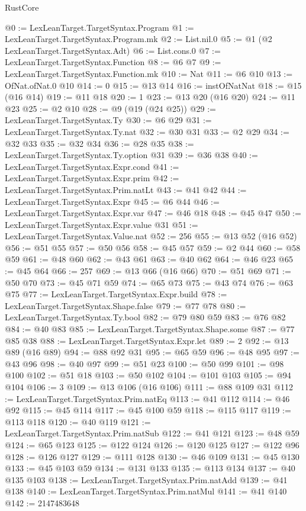 \begin{lexlean}{RustCore}
\begin{coremodule}
@0 := LexLeanTarget.TargetSyntax.Program
@1 := LexLeanTarget.TargetSyntax.Program.mk
@2 := List.nil.{0}
@5 := @1 (@2 LexLeanTarget.TargetSyntax.Adt)
@6 := List.cons.{0}
@7 := LexLeanTarget.TargetSyntax.Function
@8 := @6 @7
@9 := LexLeanTarget.TargetSyntax.Function.mk
@10 := Nat
@11 := @6 @10
@13 := OfNat.ofNat.{0} @10
@14 := 0
@15 := @13 @14
@16 := instOfNatNat
@18 := @15 (@16 @14)
@19 := @11 @18
@20 := 1
@23 := @13 @20 (@16 @20)
@24 := @11 @23
@25 := @2 @10
@28 := @9 (@19 (@24 @25))
@29 := LexLeanTarget.TargetSyntax.Ty
@30 := @6 @29
@31 := LexLeanTarget.TargetSyntax.Ty.nat
@32 := @30 @31
@33 := @2 @29
@34 := @32 @33
@35 := @32 @34
@36 := @28 @35
@38 := LexLeanTarget.TargetSyntax.Ty.option @31
@39 := @36 @38
@40 := LexLeanTarget.TargetSyntax.Expr.cond
@41 := LexLeanTarget.TargetSyntax.Expr.prim
@42 := LexLeanTarget.TargetSyntax.Prim.natLt
@43 := @41 @42
@44 := LexLeanTarget.TargetSyntax.Expr
@45 := @6 @44
@46 := LexLeanTarget.TargetSyntax.Expr.var
@47 := @46 @18
@48 := @45 @47
@50 := LexLeanTarget.TargetSyntax.Expr.value @31
@51 := LexLeanTarget.TargetSyntax.Value.nat
@52 := 256
@55 := @13 @52 (@16 @52)
@56 := @51 @55
@57 := @50 @56
@58 := @45 @57
@59 := @2 @44
@60 := @58 @59
@61 := @48 @60
@62 := @43 @61
@63 := @40 @62
@64 := @46 @23
@65 := @45 @64
@66 := 257
@69 := @13 @66 (@16 @66)
@70 := @51 @69
@71 := @50 @70
@73 := @45 @71 @59
@74 := @65 @73
@75 := @43 @74
@76 := @63 @75
@77 := LexLeanTarget.TargetSyntax.Expr.build
@78 := LexLeanTarget.TargetSyntax.Shape.false
@79 := @77 @78
@80 := LexLeanTarget.TargetSyntax.Ty.bool
@82 := @79 @80 @59
@83 := @76 @82
@84 := @40 @83
@85 := LexLeanTarget.TargetSyntax.Shape.some
@87 := @77 @85 @38
@88 := LexLeanTarget.TargetSyntax.Expr.let
@89 := 2
@92 := @13 @89 (@16 @89)
@94 := @88 @92 @31
@95 := @65 @59
@96 := @48 @95
@97 := @43 @96
@98 := @40 @97
@99 := @51 @23
@100 := @50 @99
@101 := @98 @100
@102 := @51 @18
@103 := @50 @102
@104 := @101 @103
@105 := @94 @104
@106 := 3
@109 := @13 @106 (@16 @106)
@111 := @88 @109 @31
@112 := LexLeanTarget.TargetSyntax.Prim.natEq
@113 := @41 @112
@114 := @46 @92
@115 := @45 @114
@117 := @45 @100 @59
@118 := @115 @117
@119 := @113 @118
@120 := @40 @119
@121 := LexLeanTarget.TargetSyntax.Prim.natSub
@122 := @41 @121
@123 := @48 @59
@124 := @65 @123
@125 := @122 @124
@126 := @120 @125
@127 := @122 @96
@128 := @126 @127
@129 := @111 @128
@130 := @46 @109
@131 := @45 @130
@133 := @45 @103 @59
@134 := @131 @133
@135 := @113 @134
@137 := @40 @135 @103
@138 := LexLeanTarget.TargetSyntax.Prim.natAdd
@139 := @41 @138
@140 := LexLeanTarget.TargetSyntax.Prim.natMul
@141 := @41 @140
@142 := 2147483648

\end{coremodule}
\end{lexlean}

